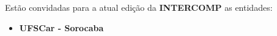 
\begin{article}
	\label{art:convidadas}
	Estão convidadas para a atual edição da \textbf{INTERCOMP} as entidades:
	\begin{itemize}[noitemsep]
			\item \textbf{UFSCar - Sorocaba}
	\end{itemize}
\end{article}

